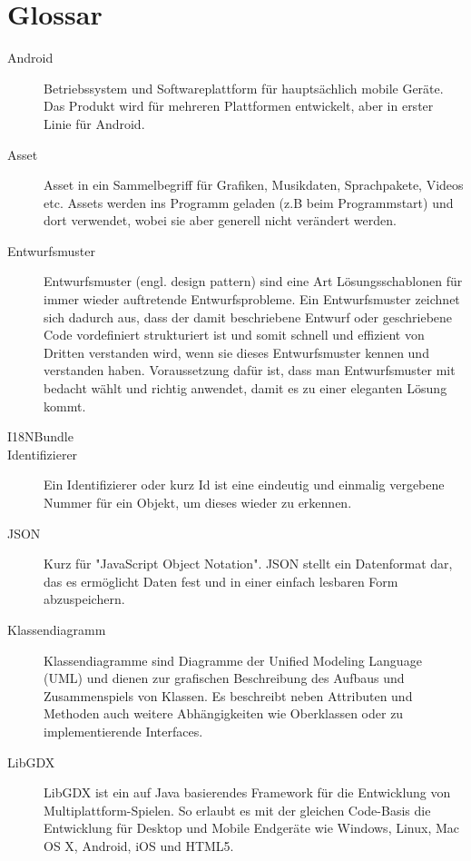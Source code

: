 \section{Glossar}
\begin{description}

\item[Android]
Betriebssystem und Softwareplattform für hauptsächlich mobile Geräte.
Das Produkt wird für mehreren Plattformen entwickelt, aber in erster Linie für Android.

\item[Asset]
Asset in ein Sammelbegriff für Grafiken, Musikdaten, Sprachpakete, Videos etc. 
Assets werden ins Programm geladen (z.B beim Programmstart) und dort verwendet, wobei sie aber generell nicht verändert werden.

\item[Entwurfsmuster]
Entwurfsmuster (engl. design pattern) sind eine Art Lösungsschablonen für immer wieder auftretende Entwurfsprobleme. Ein Entwurfsmuster zeichnet sich dadurch aus, dass der damit beschriebene Entwurf oder geschriebene Code vordefiniert strukturiert ist und somit schnell und effizient von Dritten verstanden wird, wenn sie dieses Entwurfsmuster kennen und verstanden haben. Voraussetzung dafür ist, dass man Entwurfsmuster mit bedacht wählt und richtig anwendet, damit es zu einer eleganten Lösung kommt.

\item[I18NBundle]

\item[Identifizierer]
Ein Identifizierer oder kurz Id ist eine eindeutig und einmalig vergebene Nummer für ein Objekt, um dieses wieder zu erkennen.

\item[JSON]
Kurz für "JavaScript Object Notation". JSON stellt ein Datenformat dar, das es ermöglicht Daten fest und in einer einfach lesbaren Form abzuspeichern.

\item[Klassendiagramm]
Klassendiagramme sind Diagramme der Unified Modeling Language (UML) und dienen zur grafischen Beschreibung des Aufbaus und Zusammenspiels von Klassen.
Es beschreibt neben Attributen und Methoden auch weitere Abhängigkeiten wie Oberklassen oder zu implementierende Interfaces.

\item[LibGDX]
LibGDX ist ein auf Java basierendes Framework für die Entwicklung von Multiplattform-Spielen. So erlaubt es mit der gleichen Code-Basis die Entwicklung für Desktop und Mobile Endgeräte wie Windows, Linux, Mac OS X, Android, iOS und HTML5. 


\end{description}
